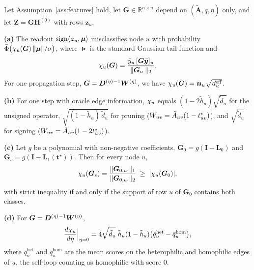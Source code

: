 \begin{theorem}\label{thm:snr}
Let Assumption~\ref{ass:features} hold, let $\bm G\in\mathbb R^{n\times n}$ depend on $(\tilde{\bm A},q,\eta)$ only, and let $\bm Z=\bm G\bm H^{(0)}$ with rows $\bm z_u$.

\smallskip\noindent\textbf{(a)} The readout $\operatorname{sign}\langle\bm z_u,\bm\mu\rangle$ misclassifies node $u$ with probability $\bar{\Phi}\bigl(\chi_u(\bm G)\,\|\bm\mu\|/\sigma\bigr)$, where $\Gt$ is the standard Gaussian tail function and
\[
\chi_u(\bm G)=\frac{\bar y_u\,[\bm G\bar{\bm{y}}]_u}{\|\bm G_{u\cdot}\|_2}.
\]
For one propagation step, $\bm G=\bm{D}^{(\eta)}{}^{-1}\bm{W}^{(\eta)}$, we have $\chi_u(\bm G)=\mathfrak{m}_u\sqrt{d^{\mathrm{eff}}_u}$.

\smallskip\noindent\textbf{(b)} For one step with oracle edge information, $\chi_u$ equals $(1-2\tilde h_u)\sqrt{\tilde d_u}$ for the unsigned operator, $\sqrt{(1-\tilde h_u)\,\tilde d_u}$ for pruning ($W_{uv}=\tilde A_{uv}(1-t^{\star}_{uv})$), and $\sqrt{\tilde d_u}$ for signing ($W_{uv}=\tilde A_{uv}(1-2t^{\star}_{uv})$).

\smallskip\noindent\textbf{(c)} Let $g$ be a polynomial with non-negative coefficients, $\bm G_0=g(\bm I-\bm L_0)$ and $\bm G_s=g(\bm I-\bm L_1(\bm t^\star))$. Then for every node $u$,
\[
\chi_u(\bm G_s)=\frac{\|\bm G_{0,u\cdot}\|_1}{\|\bm G_{0,u\cdot}\|_2}\;\ge\;|\chi_u(\bm G_0)|,
\]
with strict inequality if and only if the support of row $u$ of $\bm G_0$ contains both classes.

\smallskip\noindent\textbf{(d)} For $\bm G=\bm{D}^{(\eta)}{}^{-1}\bm{W}^{(\eta)}$,
\[
\frac{d\chi_u}{d\eta}\Big|_{\eta=0}
=4\sqrt{\tilde d_u}\;\tilde h_u(1-\tilde h_u)\bigl(\bar q^{\mathrm{het}}_u-\bar q^{\mathrm{hom}}_u\bigr),
\]
where $\bar q^{\mathrm{het}}_u$ and $\bar q^{\mathrm{hom}}_u$ are the mean scores on the heterophilic and homophilic edges of $u$, the self-loop counting as homophilic with score $0$.
\end{theorem}

